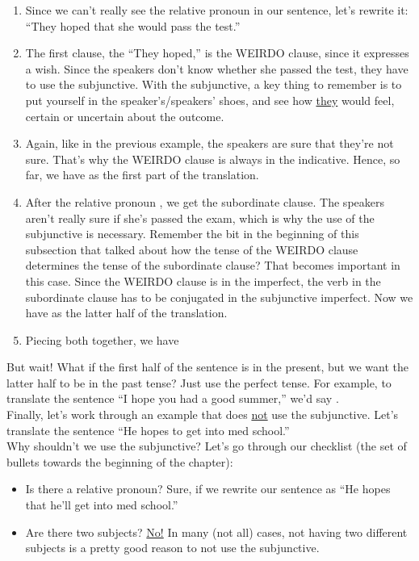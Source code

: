 \begin{enumerate}
	\item Since we can't really see the relative pronoun in our sentence, let's rewrite it: ``They hoped that she would pass the test.''
	\item The first clause, the ``They hoped,'' is the WEIRDO clause, since it expresses a wish. Since the speakers don't know whether she passed the test, they have to use the subjunctive. With the subjunctive, a key thing to remember is to put yourself in the speaker's/speakers' shoes, and see how \underline{they} would feel, certain or uncertain about the outcome. 
	\item Again, like in the previous example, the speakers are sure that they're not sure. That's why the WEIRDO clause is always in the indicative. Hence, so far, we have  as the first part of the translation.
	\item After the relative pronoun , we get the subordinate clause. The speakers aren't really sure if she's passed the exam, which is why the use of the subjunctive is necessary. Remember the bit in the beginning of this subsection that talked about how the tense of the WEIRDO clause determines the tense of the subordinate clause? That becomes important in this case. Since the WEIRDO clause is in the imperfect, the verb in the subordinate clause has to be conjugated in the subjunctive imperfect. Now we have  as the latter half of the translation.
	\item Piecing both together, we have 
\end{enumerate}

But wait! What if the first half of the sentence is in the present, but we want the latter half to be in the past tense? Just use the perfect tense. For example, to translate the sentence ``I hope you had a good summer,'' we'd say . \\

Finally, let's work through an example that does \underline{not} use the subjunctive. Let's translate the sentence ``He hopes to get into med school.'' \\

Why shouldn't we use the subjunctive? Let's go through our checklist (the set of bullets towards the beginning of the chapter):
\begin{itemize}[noitemsep]
	\item Is there a relative pronoun? Sure, if we rewrite our sentence as ``He hopes that he'll get into med school.''
	\item Are there two subjects? \underline{No!} In many (not all) cases, not having two different subjects is a pretty good reason to not use the subjunctive.
\end{itemize}

